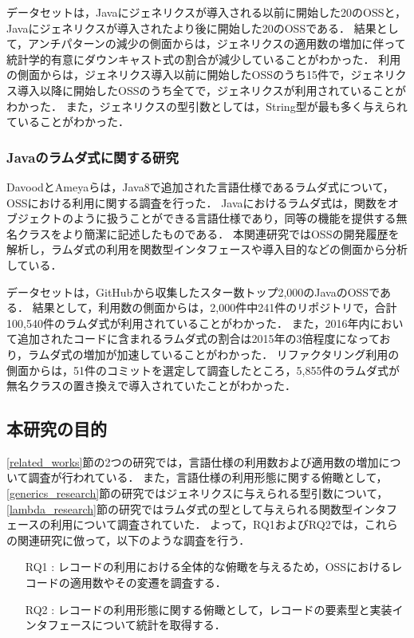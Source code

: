 データセットは，Javaにジェネリクスが導入される以前に開始した20のOSSと，Javaにジェネリクスが導入されたより後に開始した20のOSSである．
結果として，アンチパターンの減少の側面からは，ジェネリクスの適用数の増加に伴って統計学的有意にダウンキャスト式の割合が減少していることがわかった．
利用の側面からは，ジェネリクス導入以前に開始したOSSのうち15件で，ジェネリクス導入以降に開始したOSSのうち全てで，ジェネリクスが利用されていることがわかった．
また，ジェネリクスの型引数としては，String型が最も多く与えられていることがわかった．

\subsubsection{Javaのラムダ式に関する研究\label{lambda_research}}
DavoodとAmeyaらは，Java8で追加された言語仕様であるラムダ式について，OSSにおける利用に関する調査を行った\cite{Lambda_Research}．
Javaにおけるラムダ式は，関数をオブジェクトのように扱うことができる言語仕様であり，同等の機能を提供する無名クラスをより簡潔に記述したものである．
本関連研究ではOSSの開発履歴を解析し，ラムダ式の利用を関数型インタフェースや導入目的などの側面から分析している．

データセットは，GitHubから収集したスター数トップ2,000のJavaのOSSである．
結果として，利用数の側面からは，2,000件中241件のリポジトリで，合計100,540件のラムダ式が利用されていることがわかった．
また，2016年内において追加されたコードに含まれるラムダ式の割合は2015年の3倍程度になっており，ラムダ式の増加が加速していることがわかった．
リファクタリング利用の側面からは，51件のコミットを選定して調査したところ，5,855件のラムダ式が無名クラスの置き換えで導入されていたことがわかった．

\subsection{本研究の目的\label{research_goals}}
\ref{related_works}節の2つの研究では，言語仕様の利用数および適用数の増加について調査が行われている．
また，言語仕様の利用形態に関する俯瞰として，\ref{generics_research}節の研究ではジェネリクスに与えられる型引数について，\ref{lambda_research}節の研究ではラムダ式の型として与えられる関数型インタフェースの利用について調査されていた．
よって，RQ1およびRQ2では，これらの関連研究に倣って，以下のような調査を行う．
\begin{itemize}
    \item[RQ1 : ] レコードの利用における全体的な俯瞰を与えるため，OSSにおけるレコードの適用数やその変遷を調査する．
    \item[RQ2 : ] レコードの利用形態に関する俯瞰として，レコードの要素型と実装インタフェースについて統計を取得する．
\end{itemize}

